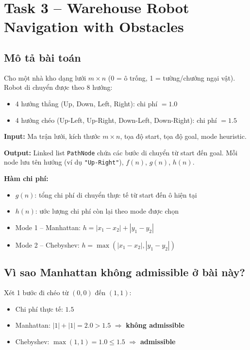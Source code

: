 \documentclass[13pt,a4paper]{article}
\begin{document}
\newpage

\section{Task 3 -- Warehouse Robot Navigation with Obstacles}

\subsection{Mô tả bài toán}

Cho một nhà kho dạng lưới $m \times n$ (0 = ô trống, 1 = tường/chướng ngại vật). Robot di chuyển được theo 8 hướng:
\begin{itemize}
    \item 4 hướng thẳng (Up, Down, Left, Right): chi phí $= 1.0$
    \item 4 hướng chéo (Up-Left, Up-Right, Down-Left, Down-Right): chi phí $= 1.5$
\end{itemize}

\textbf{Input:} Ma trận lưới, kích thước $m \times n$, tọa độ start, tọa độ goal, mode heuristic.

\textbf{Output:} Linked list \texttt{PathNode} chứa các bước di chuyển từ start đến goal. Mỗi node lưu tên hướng (ví dụ \texttt{"Up-Right"}), $f(n)$, $g(n)$, $h(n)$.

\textbf{Hàm chi phí:}
\begin{itemize}
    \item $g(n)$: tổng chi phí di chuyển thực tế từ start đến ô hiện tại
    \item $h(n)$: ước lượng chi phí còn lại theo mode được chọn
    \item Mode 1 -- Manhattan: $h = |x_1-x_2| + |y_1-y_2|$
    \item Mode 2 -- Chebyshev: $h = \max(|x_1-x_2|,|y_1-y_2|)$
\end{itemize}

\subsection{Vì sao Manhattan không admissible ở bài này?}

Xét 1 bước đi chéo từ $(0,0)$ đến $(1,1)$:
\begin{itemize}
    \item Chi phí thực tế: $1.5$
    \item Manhattan: $|1|+|1| = 2.0 > 1.5$ $\Rightarrow$ \textbf{không admissible}
    \item Chebyshev: $\max(1,1) = 1.0 \leq 1.5$ $\Rightarrow$ \textbf{admissible}
\end{itemize}
\end{document}
